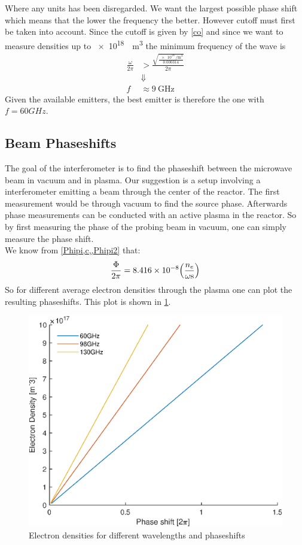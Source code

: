 Where any units has been disregarded. We want the largest possible phase shift which means that the lower the frequency the better. However cutoff must first be taken into account.
Since the cutoff is given by \cref{co} and since we want to measure densities up to \SI{e18}{\per\meter\cubed} the minimum frequency of the wave is
\begin{align}
	\frac{\omega}{2\pi} & > \frac{\sqrt{\frac{\SI{e18}{\per\meter\cubed}}{0.000314}}}{2\pi} \\
	                    & \Downarrow\nonumber                                               \\
	f                   & \approx \SI{9}{\giga\hertz}
\end{align}
Given the available emitters, the best emitter is therefore the one with \(f=60\si{GHz}\).
\subsection{Beam Phaseshifts}
The goal of the interferometer is to find the phaseshift between the microwave beam in vacuum and in plasma. Our suggestion is a setup involving a interferometer emitting a beam through the center of the reactor. The first measurement would be through vacuum to find the source phase. Afterwards phase measurements can be conducted with an active plasma in the reactor.
So by first measuring the phase of the probing beam in vacuum, one can simply measure the phase shift.\\
We know from \cref{Phipi,c,,Phipi2} that:
\begin{align}
	\frac{\Phi}{2\pi} = 8.416\times 10^{-8}\pqty{\frac{n_e}{\omega\si{\second}}}
\end{align}
So for different average electron densities through the plasma one can plot the resulting phaseshifts.
This plot is shown in \cref{PhPlot}.
\begin{figure}
	\centering
	\includegraphics{MatlabFigures/PhaseShift/PhaseShift.eps}
	\caption{Electron densities for different wavelengths and phaseshifts}
	\label{PhPlot}
\end{figure}
